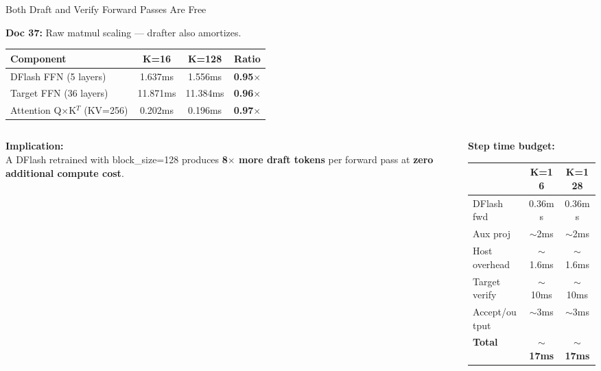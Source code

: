 \documentclass[10pt]{beamer}
\begin{document}
\begin{frame}{Both Draft and Verify Forward Passes Are Free}

\textbf{Doc 37:} Raw matmul scaling --- drafter also amortizes.

\centering
\footnotesize
\vspace{0.5em}
\begin{tabular}{l ccc}
\toprule
\textbf{Component} & \textbf{K=16} & \textbf{K=128} & \textbf{Ratio} \\
\midrule
\rowcolor{rowgreen}
DFlash FFN (5 layers) & 1.637ms & 1.556ms & \textbf{0.95$\times$} \\
\rowcolor{rowgreen}
Target FFN (36 layers) & 11.871ms & 11.384ms & \textbf{0.96$\times$} \\
\rowcolor{rowgreen}
Attention Q$\times$K$^T$ (KV=256) & 0.202ms & 0.196ms & \textbf{0.97$\times$} \\
\bottomrule
\end{tabular}

\vspace{0.8em}
\begin{columns}[T]
\begin{column}{0.48\textwidth}
\textbf{Implication:}\\
A DFlash retrained with block\_size=128 produces \textbf{8$\times$ more draft tokens} per forward pass at \textbf{zero additional compute cost}.
\end{column}
\begin{column}{0.48\textwidth}
\textbf{Step time budget:}\\[0.3em]
\tiny
\begin{tabular}{lcc}
\toprule
& K=16 & K=128 \\
\midrule
DFlash fwd & 0.36ms & 0.36ms \\
Aux proj & $\sim$2ms & $\sim$2ms \\
Host overhead & $\sim$1.6ms & $\sim$1.6ms \\
Target verify & $\sim$10ms & $\sim$10ms \\
Accept/output & $\sim$3ms & $\sim$3ms \\
\midrule
\textbf{Total} & \textbf{$\sim$17ms} & \textbf{$\sim$17ms} \\
\bottomrule
\end{tabular}
\end{column}
\end{columns}
\end{frame}
\end{document}
